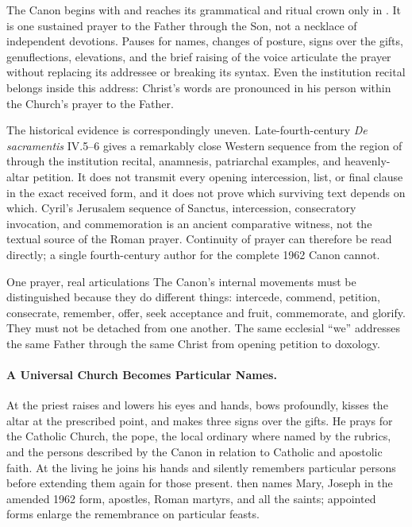
The Canon begins with  and reaches its grammatical and ritual crown only in . It is one sustained prayer to the Father through the Son, not a necklace of independent devotions. Pauses for names, changes of posture, signs over the gifts, genuflections, elevations, and the brief raising of the voice articulate the prayer without replacing its addressee or breaking its syntax. Even the institution recital belongs inside this address: Christ's words are pronounced in his person within the Church's prayer to the Father.

The historical evidence is correspondingly uneven. Late-fourth-century \emph{De sacramentis} IV.5--6 gives a remarkably close Western sequence from the region of  through the institution recital, anamnesis, patriarchal examples, and heavenly-altar petition. It does not transmit every opening intercession, list, or final clause in the exact received form, and it does not prove which surviving text depends on which. Cyril's Jerusalem sequence of Sanctus, intercession, consecratory invocation, and commemoration is an ancient comparative witness, not the textual source of the Roman prayer. Continuity of prayer can therefore be read directly; a single fourth-century author for the complete 1962 Canon cannot.

\begin{massbox}{One prayer, real articulations}
The Canon's internal movements must be distinguished because they do different things: intercede, commend, petition, consecrate, remember, offer, seek acceptance and fruit, commemorate, and glorify. They must not be detached from one another. The same ecclesial ``we'' addresses the same Father through the same Christ from opening petition to doxology.
\end{massbox}

\paragraph{A Universal Church Becomes Particular Names.}

At  the priest raises and lowers his eyes and hands, bows profoundly, kisses the altar at the prescribed point, and makes three signs over the gifts. He prays for the Catholic Church, the pope, the local ordinary where named by the rubrics, and the persons described by the Canon in relation to Catholic and apostolic faith. At the living  he joins his hands and silently remembers particular persons before extending them again for those present.  then names Mary, Joseph in the amended 1962 form, apostles, Roman martyrs, and all the saints; appointed forms enlarge the remembrance on particular feasts.


